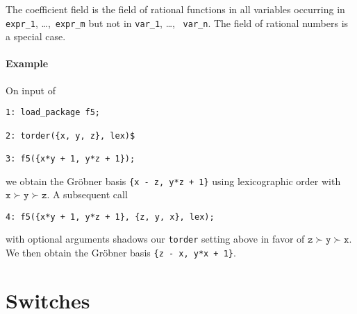 \documentclass{article}
\newcommand{\grobner}{Gr\"obner}
\newcommand{\code}[1]{\texttt{#1}}
\begin{document}
The coefficient
field is the field of rational functions in all variables occurring in
\code{expr\_1}, \dots,~\code{expr\_m} but not in \code{var\_1}, \dots,~
\code{var\_n}. The field of rational numbers is a special case.
%
\paragraph{Example}
On input of
\begin{verbatim}
1: load_package f5;

2: torder({x, y, z}, lex)$

3: f5({x*y + 1, y*z + 1});
\end{verbatim}
we obtain the \grobner{} basis
\code{\{x - z, y*z + 1\}} using lexicographic order with $\code{x} \succ
\code{y} \succ \code{z}$. A subsequent call
\begin{verbatim}
4: f5({x*y + 1, y*z + 1}, {z, y, x}, lex);
\end{verbatim}
with optional arguments shadows our \code{torder} setting above in favor of $
\code{z}
\succ \code{y} \succ \code{x}$. We then obtain the \grobner{} basis
\code{\{z - x, y*x + 1\}}.
%
\section{Switches}
\label{SE:switches}
\end{document}
